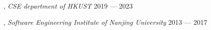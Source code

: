 
, \textit{CSE department of HKUST}	\hfill 2019 --- 2023

, \textit{Software Engineering Institute of Nanjing University } \hfill    2013 --- 2017





